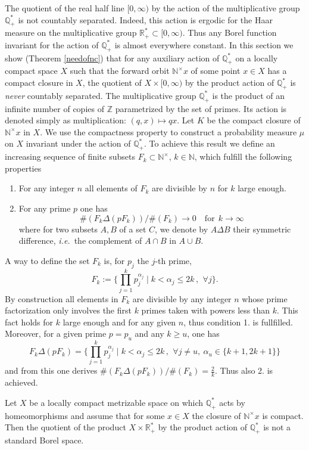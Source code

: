 \documentclass[graybox, envcountsect%
]{svmult}
\def\N{{\mathbb N}}
\def\Q{{\mathbb Q}}
\def\R{{\mathbb R}}
\def\Z{{\mathbb Z}}
\def\qqq{\,,\,~\forall}
\newcommand{\ie}{{\it i.e.\/}\ }
\def\nt{\N^{\times}}
\begin{document}
 The quotient of the real half line $[0,\infty)$ by the action of the multiplicative group $\Q^*_+$ is not countably separated. Indeed, this action is ergodic for the Haar measure on the multiplicative group $\R_+^*\subset [0,\infty)$. Thus any Borel function invariant for the action of $\Q^*_+$ is almost everywhere constant. In this section we show (Theorem \ref{needofnc}) that for any auxiliary action  of $\Q^*_+$ on a locally compact space $X$ such that the forward orbit $\nt x$ of some point $x\in X$ has a compact closure in $X$, the quotient of  $X\times [0,\infty)$ by the product action of $\Q^*_+$ is \emph{never} countably separated. The multiplicative group $\Q^*_+$ is the product of  an infinite number of copies of $\Z$ parametrized by the set of primes.  Its action is denoted simply as multiplication: $(q,x)\mapsto qx$. Let $K$ be the compact closure of  $\nt x$  in $X$.  We use the compactness property to construct a probability measure $\mu$ on $X$ invariant under the action of $\Q^*_+$. To achieve this result we define an increasing sequence of finite subsets  $F_k\subset \nt$, $k\in\N$, which fulfill the following properties 
 \begin{enumerate}
 \item For any integer $n$ all elements of $F_k$ are divisible by $n$ for $k$ large enough. 
 \item For any prime $p$  one has
$$
\#(F_k \Delta (pF_k))/\#(F_k) \to 0 \quad \text{for} ~~ k\to \infty 
$$ 	
where for two subsets $A,B$ of a set $C$, we denote by $A\Delta B$ their symmetric difference, \ie the complement of $A\cap B$ in $A \cup B$.
 \end{enumerate}
A way to define the set $F_k$ is, for $p_j$ the $j$-th prime,  
$$
F_k:=\{\prod_{j=1}^k p_j^{\alpha_j}\mid k< \alpha_j\leq 2k \qqq j\}.
$$
By construction all elements in $F_k$ are divisible by any integer $n$ whose prime factorization only involves the first $k$ primes taken with powers less than $k$. This fact holds for $k$ large enough and for any given $n$, thus condition  1. is fullfilled. Moreover, for a given prime $p=p_u$ and any $k\geq u$, one has 
$$
F_k \Delta (pF_k)=\{\prod_{j=1}^k p_j^{\alpha_j}\mid k< \alpha_j\leq 2k \qqq j\neq u, \ \alpha_u\in \{k+1,2k+1\}\}
$$
and from this one derives $\#(F_k \Delta (pF_k))/\#(F_k) =\frac 2k$. Thus also 2. is achieved.
 
\begin{theorem}\label{needofnc} Let $X$ be a locally compact metrizable space on  which $\Q_+^*$ acts by homeomorphisms and assume that for some $x\in X$ the closure of $\nt x$ is compact. Then the quotient of the product $X\times \R_+^*$ by the product action of $\Q_+^*$ is not a standard Borel space.	
\end{theorem}
\end{document}
